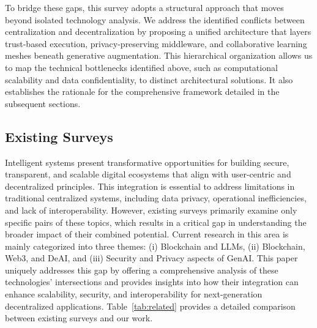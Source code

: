 \documentclass[5p,twocolumn]{elsarticle}
\begin{document}
To bridge these gaps, this survey adopts a structural approach that moves beyond isolated technology analysis. We address the identified conflicts between centralization and decentralization by proposing a unified architecture that layers trust-based execution, privacy-preserving middleware, and collaborative learning meshes beneath generative augmentation. This hierarchical organization allows us to map the technical bottlenecks identified above, such as computational scalability and data confidentiality, to distinct architectural solutions. It also establishes the rationale for the comprehensive framework detailed in the subsequent sections.


\subsection{Existing Surveys}
Intelligent systems present transformative opportunities for building secure, transparent, and scalable digital ecosystems that align with user-centric and decentralized principles. This integration is essential to address limitations in traditional centralized systems, including data privacy, operational inefficiencies, and lack of interoperability. However, existing surveys primarily examine only specific pairs of these topics, which results in a critical gap in understanding the broader impact of their combined potential. Current research in this area is mainly categorized into three themes: (i) Blockchain and LLMs, (ii) Blockchain, Web3, and DeAI, and (iii) Security and Privacy aspects of GenAI. This paper uniquely addresses this gap by offering a comprehensive analysis of these technologies' intersections and provides insights into how their integration can enhance scalability, security, and interoperability for next-generation decentralized applications. Table~\ref{tab:related} provides a detailed comparison between existing surveys and our work.
\end{document}
